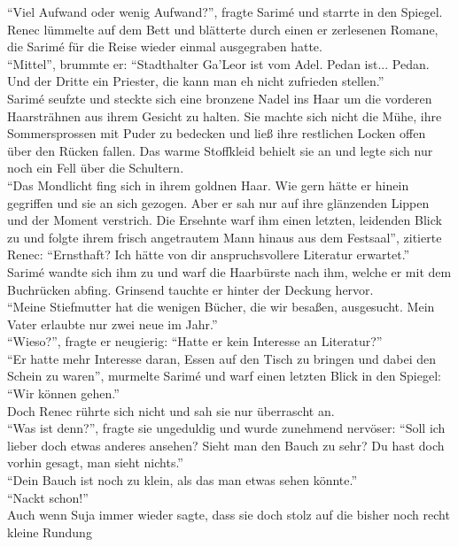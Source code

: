 ``Viel Aufwand oder wenig Aufwand?'', fragte Sarimé und starrte in den Spiegel.\\
Renec lümmelte auf dem Bett und blätterte durch einen er zerlesenen Romane, die Sarimé für die 
Reise wieder einmal ausgegraben hatte.\\
``Mittel'', brummte er: ``Stadthalter Ga'Leor ist vom Adel. Pedan ist... Pedan. Und der Dritte ein 
Priester, die kann man eh nicht zufrieden stellen.''\\
Sarimé seufzte und steckte sich eine bronzene Nadel ins Haar um die vorderen Haarsträhnen aus ihrem 
Gesicht zu halten. Sie machte sich nicht die Mühe, ihre Sommersprossen mit Puder zu bedecken und 
ließ ihre restlichen Locken offen über den Rücken fallen. Das warme Stoffkleid behielt sie an und 
legte sich nur noch ein Fell über die Schultern.\\
``Das Mondlicht fing sich in ihrem goldnen Haar. Wie gern hätte er hinein gegriffen und sie an sich 
gezogen. Aber er sah nur auf ihre glänzenden Lippen und der Moment verstrich. Die Ersehnte warf ihm 
einen letzten, leidenden Blick zu und folgte ihrem frisch angetrautem Mann hinaus aus dem 
Festsaal'', zitierte Renec: ``Ernsthaft? Ich hätte von dir anspruchsvollere Literatur erwartet.''\\
Sarimé wandte sich ihm zu und warf die Haarbürste nach ihm, welche er mit dem Buchrücken abfing. 
Grinsend tauchte er hinter der Deckung hervor.\\
``Meine Stiefmutter hat die wenigen Bücher, die wir besaßen, ausgesucht. Mein Vater erlaubte nur 
zwei neue im Jahr.''\\
``Wieso?'', fragte er neugierig: ``Hatte er kein Interesse an Literatur?''\\
``Er hatte mehr Interesse daran, Essen auf den Tisch zu bringen und dabei den Schein zu waren'', 
murmelte Sarimé und warf einen letzten Blick in den Spiegel: ``Wir können gehen.''\\
Doch Renec rührte sich nicht und sah sie nur überrascht an.\\
``Was ist denn?'', fragte sie ungeduldig und wurde zunehmend nervöser: ``Soll ich lieber doch etwas 
anderes ansehen? Sieht man den Bauch zu sehr? Du hast doch vorhin gesagt, man sieht nichts.''\\
``Dein Bauch ist noch zu klein, als das man etwas sehen könnte.''\\
``Nackt schon!''\\
Auch wenn Suja immer wieder sagte, dass sie doch stolz auf die bisher noch recht kleine Rundung 
